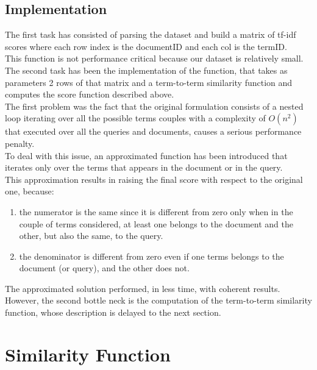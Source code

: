 \documentclass[twoside]{article}
\begin{document}
\subsection{Implementation}
The first task has consisted of parsing the dataset and build a matrix of tf-idf scores where each row index is the documentID and each col is the termID.\\This function is not performance critical because our dataset is relatively small.\\The second task has been the implementation of the function, that takes as parameters 2 rows of that matrix and a term-to-term similarity function and computes the score function described above.\\The first problem was the fact that the original formulation consists of a nested loop iterating over all the possible terms couples with a complexity of $O(n^2)$ that executed over all the queries and documents, causes a serious performance penalty.\\To deal with this issue, an approximated function has been introduced that iterates only over the terms that appears in the document or in the query.\\This approximation results in raising the final score with respect to the original one, because: 
\begin{enumerate}
\item the numerator is the same since it is different from zero only when in the couple of terms considered, at least one belongs to the document and the other, but also the same, to the query.
\item the denominator is different from zero even if one terms belongs to the document (or query), and the other does not.
\end{enumerate}
The approximated solution performed, in less time, with coherent results.\\However, the second bottle neck is the computation of the term-to-term similarity function, whose description is delayed to the next section.

\section{Similarity Function}
\end{document}
